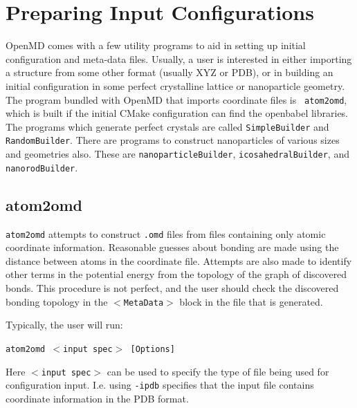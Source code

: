 \documentclass[]{book}
\begin{document}
\chapter{\label{section:PreparingInput} Preparing Input Configurations}

{\sc OpenMD} comes with a few utility programs to aid in setting up
initial configuration and meta-data files.  Usually, a user is
interested in either importing a structure from some other format
(usually XYZ or PDB), or in building an initial configuration in some
perfect crystalline lattice or nanoparticle geometry. The program
bundled with {\sc OpenMD} that imports coordinate files is {\tt
  atom2omd}, which is built if the initial CMake configuration can find
the openbabel libraries. The programs which generate perfect crystals
are called {\tt SimpleBuilder} and {\tt RandomBuilder}.  There are
programs to construct nanoparticles of various sizes and geometries
also.  These are {\tt nanoparticleBuilder}, {\tt icosahedralBuilder},
and {\tt nanorodBuilder}.

\section{\label{section:atom2omd}atom2omd}

{\tt atom2omd} attempts to construct {\tt .omd} files from files
containing only atomic coordinate information. Reasonable guesses
about bonding are made using the distance between atoms in the
coordinate file.  Attempts are also made to identify other terms in
the potential energy from the topology of the graph of discovered
bonds.  This procedure is not perfect, and the user should check the
discovered bonding topology in the {\tt $<$MetaData$>$} block in the
file that is generated.

Typically, the user will run:

{\tt atom2omd $<$input spec$>$ [Options]}

Here {\tt $<$input spec$>$} can be used to specify the type of file being
used for configuration input. I.e. using {\tt -ipdb} specifies that the
input file contains coordinate information in the PDB format.
\end{document}
